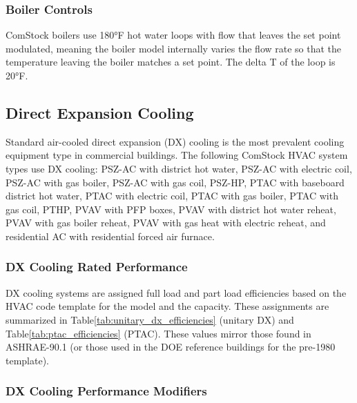 \subsubsection{Boiler Controls}

ComStock boilers use 180°F hot water loops with flow that leaves the set point modulated, meaning the boiler model internally varies the flow rate so that the temperature leaving the boiler matches a set point. The delta T of the loop is 20°F. %



\subsection{Direct Expansion Cooling}

Standard air-cooled direct expansion (DX) cooling is the most prevalent cooling equipment type in commercial buildings. The following ComStock HVAC system types use DX cooling: PSZ-AC with district hot water, PSZ-AC with electric coil, PSZ-AC with gas boiler, PSZ-AC with gas coil, PSZ-HP, PTAC with baseboard district hot water, PTAC with electric coil, PTAC with gas boiler, PTAC with gas coil, PTHP, PVAV with PFP boxes, PVAV with district hot water reheat, PVAV with gas boiler reheat, PVAV with gas heat with electric reheat, and residential AC with residential forced air furnace.

\subsubsection{DX Cooling Rated Performance}

DX cooling systems are assigned full load and part load efficiencies based on the HVAC code template for the model and the capacity. These assignments are summarized in Table\ref{tab:unitary_dx_efficiencies} (unitary DX) and Table\ref{tab:ptac_efficiencies} (PTAC). These values mirror those found in ASHRAE-90.1 (or those used in the DOE reference buildings for the pre-1980 template).


\subsubsection{DX Cooling Performance Modifiers}


